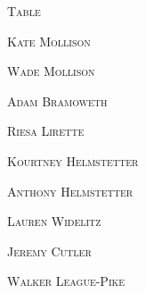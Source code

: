 \documentclass[12pt]{article}
\begin{document}
\pagestyle{empty}
\centering




\newpage

\vspace*{.25in}

\textsc{\Huge Table}
\vspace*{.3in}


\vspace*{\fill}

\textsc{\Huge Kate Mollison}

\vspace*{.15in}
\textsc{\Huge Wade Mollison}

\vspace*{.15in}
\textsc{\Huge Adam Bramoweth}

\vspace*{.15in}
\textsc{\Huge Riesa Lirette}

\vspace*{.15in}
\textsc{\Huge Kourtney Helmstetter}

\vspace*{.15in}
\textsc{\Huge Anthony Helmstetter}

\vspace*{.15in}
\textsc{\Huge Lauren Widelitz}

\vspace*{.15in}
\textsc{\Huge Jeremy Cutler}

\vspace*{.15in}
\textsc{\Huge Walker League-Pike}

\vspace*{\fill}
\end{document}
